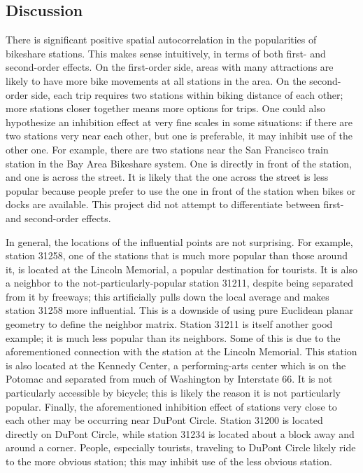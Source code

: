 \documentclass[letterpaper,11pt]{article}
\begin{document}
\subsection{Discussion}

There is significant positive spatial autocorrelation in the
popularities of bikeshare stations. This makes sense intuitively, in
terms of both first- and second-order effects. On the first-order
side, areas with many attractions are likely to have more bike
movements at all stations in the area. On the second-order side, each
trip requires two stations within biking distance of each other; more
stations closer together means more options for trips. One could also
hypothesize an inhibition effect at very fine scales in some
situations: if there are two stations very near each other, but one is
preferable, it may inhibit use of the other one. For example, there
are two stations near the San Francisco train station in the Bay Area
Bikeshare system. One is directly in front of the station, and one is
across the street. It is likely that the one across the street is less
popular because people prefer to use the one in front of the station
when bikes or docks are available. This project did not attempt to
differentiate between first- and second-order effects.

In general, the locations of the influential points are not
surprising. For example, station 31258, one of the stations that is
much more popular than those around it, is located at the Lincoln
Memorial, a popular destination for tourists. It is also a neighbor to
the not-particularly-popular station 31211, despite being separated
from it by freeways; this artificially pulls down the local average and
makes station 31258 more influential. This is a downside of using pure
Euclidean planar geometry to define the neighbor matrix. Station 31211
is itself another good example; it is much less popular than its
neighbors. Some of this is due to the aforementioned connection with
the station at the Lincoln Memorial. This station is also located at
the Kennedy Center, a performing-arts center which is on the Potomac
and separated from much of Washington by Interstate 66. It is not
particularly accessible by bicycle; this is likely the reason it is
not particularly popular. Finally, the aforementioned inhibition
effect of stations very close to each other may be occurring near
DuPont Circle. Station 31200 is located directly on DuPont Circle,
while station 31234 is located about a block away and around a
corner. People, especially tourists, traveling to DuPont Circle likely
ride to the more obvious station; this may inhibit use of the less
obvious station.
\end{document}
